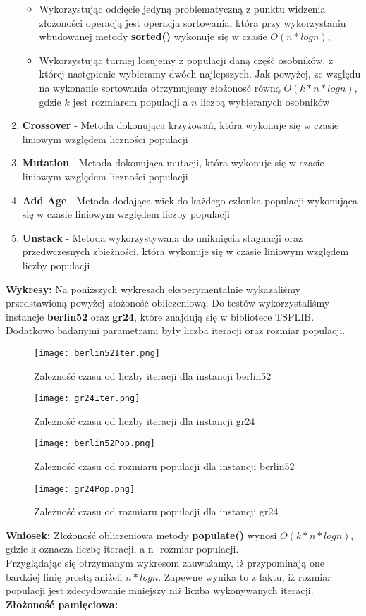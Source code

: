 \begin{enumerate}
\begin{itemize}
        \item Wykorzystując odcięcie jedyną problematyczną z punktu widzenia złożoności operacją jest operacja sortowania, która przy wykorzystaniu wbudowanej metody \textbf{sorted()} wykonuje się w czasie \textbf{$O(n*log n)$},
        \item Wykorzystując turniej losujemy z populacji daną część osobników, z której następienie wybieramy dwóch najlepszych. Jak powyżej, ze względu na wykonanie sortowania otrzymujemy złożonosć równą \textbf{$O(k*n*log n)$}, gdzie $k$ jest rozmiarem populacji a $n$ liczbą wybieranych osobników
      \end{itemize}
      \item \textbf{Crossover} - Metoda dokonująca krzyżowań, która wykonuje się w czasie liniowym względem liczności populacji
      \item \textbf{Mutation} - Metoda dokonująca mutacji, która wykonuje się w czasie liniowym względem liczności populacji
      \item \textbf{Add Age} - Metoda dodająca wiek do każdego członka populacji wykonująca się w czasie liniowym względem liczby populacji 
      \item \textbf{Unstack} - Metoda wykorzystywana do uniknięcia stagnacji oraz przedwczesnych zbieżności, która wykonuje się w czasie liniowym względem liczby populacji 

    \end{enumerate}
  \textbf{Wykresy:}
  Na poniższych wykresach eksperymentalnie wykazaliśmy przedstawioną powyżej złożoność obliczeniową. 
  Do testów wykorzystaliśmy instancje \textbf{berlin52} oraz \textbf{gr24}, które znajdują się w bibliotece TSPLIB.
  Dodatkowo badanymi parametrami były liczba iteracji oraz rozmiar populacji.
  \begin{figure}[H]
    \texttt{[image: berlin52Iter.png]}
    \centering
    \caption{Zależność czasu od liczby iteracji dla instancji berlin52}
  \end{figure}
  \begin{figure}[H]
    \texttt{[image: gr24Iter.png]}
    \centering
    \caption{Zależność czasu od liczby iteracji dla instancji gr24}
  \end{figure}
  \begin{figure}[H]
    \texttt{[image: berlin52Pop.png]}
    \centering
    \caption{Zależność czasu od rozmiaru populacji dla instancji berlin52}
  \end{figure}
  \begin{figure}[H]
    \texttt{[image: gr24Pop.png]}
    \centering
    \caption{Zależność czasu od rozmiaru populacji dla instancji gr24}
  \end{figure}

  \textbf{Wniosek:} Złożoność obliczeniowa metody \textbf{populate()} wynosi \textbf{$O(k*n*log n)$}, gdzie k oznacza liczbę iteracji, a n- rozmiar populacji. \\
  Przyglądając się otrzymanym wykresom zauważamy, iż przypominają one bardziej linię prostą aniżeli $n*logn$. Zapewne wynika to z faktu, iż rozmiar populacji jest zdecydowanie mniejszy niż liczba wykonywanych iteracji.\\
 \textbf{Złożoność pamięciowa: }
